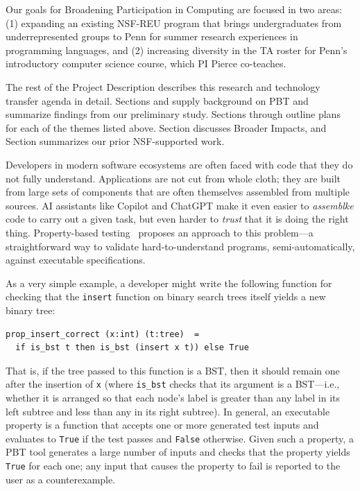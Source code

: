 %
Our goals for Broadening Participation in Computing are focused in two
areas: (1) expanding an
existing NSF-REU program that brings undergraduates from
underrepresented groups to Penn for summer research experiences in
programming languages, and (2) increasing diversity in the TA roster
for Penn's introductory computer science course, which PI Pierce
co-teaches.

\medskip

The rest of the Project Description describes this research and
technology transfer agenda in detail.  Sections
 and  supply
background on PBT and summarize findings from our
preliminary study.
%
Sections  through
 outline plans for each of the
themes listed above.
Section 
discusses Broader Impacts, and
Section  summarizes our prior
NSF-supported work.

Developers in modern software ecosystems are often faced with code
that they do not fully understand. Applications are not cut from whole cloth;
they are built from large sets of components that are often themselves
assembled from multiple sources.
AI assistants like Copilot and ChatGPT make it even
easier to {\em assemblke} code to carry out a given task, but even harder to
{\em trust} that it is doing the right thing.
%
Property-based testing~\cite{hughes_quickcheck_2007} proposes an
approach to this problem---a straightforward way to validate
hard-to-understand programs, semi-automatically,
against executable specifications.

As a very simple example, a
developer might write the following function for checking that
the \lstinline{insert} function on binary search trees itself yields a new
binary tree:
\begin{lstlisting}
prop_insert_correct (x:int) (t:tree)  =
  if is_bst t then is_bst (insert x t)) else True
\end{lstlisting}
That is, if the tree passed to this function
is a BST, then it should remain
one after the insertion of \texttt{x} (where
\lstinline{is_bst} checks that its argument is a BST---i.e., whether it
is arranged so that each node's label is greater
than any label in its left subtree and less than any in its right
subtree).
%
In general, an executable property is a function that
accepts one or more generated
test inputs
and evaluates to \lstinline{True} if the test passes and
\lstinline{False} otherwise.
Given such a property, a PBT tool generates a
large number of inputs and
checks that the property yields \lstinline{True} for each one; any input
that causes the property to fail is reported to the user as a
{counterexample}.
%


